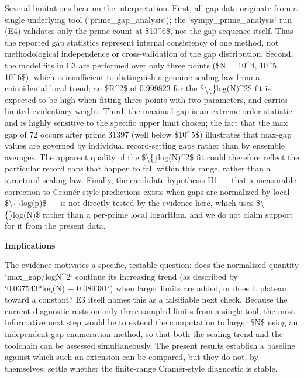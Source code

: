 \documentclass[11pt,a4paper]{article}
\begin{document}
Several limitations bear on the interpretation. First, all gap data originate from a single underlying tool (`prime\_gap\_analysis`); the `sympy\_prime\_analysis` run (E4) validates only the prime count at \$10\textasciicircum{}6\$, not the gap sequence itself. Thus the reported gap statistics represent internal consistency of one method, not methodological independence or cross-validation of the gap distribution. Second, the model fits in E3 are performed over only three points (\$N = 10\textasciicircum{}4, 10\textasciicircum{}5, 10\textasciicircum{}6\$), which is insufficient to distinguish a genuine scaling law from a coincidental local trend; an \$R\textasciicircum{}2\$ of 0.999823 for the \$\textbackslash\{\}log(N)\textasciicircum{}2\$ fit is expected to be high when fitting three points with two parameters, and carries limited evidentiary weight. Third, the maximal gap is an extreme-order statistic and is highly sensitive to the specific upper limit chosen; the fact that the max gap of 72 occurs after prime 31397 (well below \$10\textasciicircum{}5\$) illustrates that max-gap values are governed by individual record-setting gaps rather than by ensemble averages. The apparent quality of the \$\textbackslash\{\}log(N)\textasciicircum{}2\$ fit could therefore reflect the particular record gaps that happen to fall within this range, rather than a structural scaling law. Finally, the candidate hypothesis H1 — that a measurable correction to Cramér-style predictions exists when gaps are normalized by local \$\textbackslash\{\}log(p)\$ — is not directly tested by the evidence here, which uses \$\textbackslash\{\}log(N)\$ rather than a per-prime local logarithm, and we do not claim support for it from the present data.

\textbf{Implications}

The evidence motivates a specific, testable question: does the normalized quantity `max\_gap/logN\textasciicircum{}2` continue its increasing trend (as described by `0.037543*log(N) + 0.089381`) when larger limits are added, or does it plateau toward a constant? E3 itself names this as a falsifiable next check. Because the current diagnostic rests on only three sampled limits from a single tool, the most informative next step would be to extend the computation to larger \$N\$ using an independent gap-enumeration method, so that both the scaling trend and the toolchain can be assessed simultaneously. The present results establish a baseline against which such an extension can be compared, but they do not, by themselves, settle whether the finite-range Cramér-style diagnostic is stable.
\end{document}
